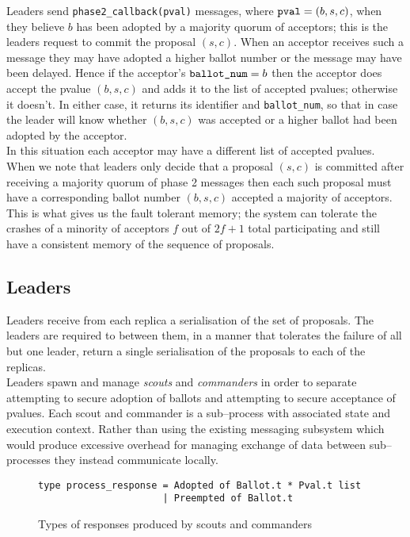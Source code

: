 Leaders send \texttt{phase2\_callback(pval)} messages, where $\textrm{\texttt{pval}} = \left( b, s, c \right)$, when they believe $b$ has been adopted by a majority quorum of acceptors; this is the leaders request to commit the proposal $(s,c)$. When an acceptor receives such a message they may have adopted a higher ballot number or the message may have been delayed. Hence if the acceptor's $\textrm{\texttt{ballot\_num}} = b$ then the acceptor does accept the pvalue $(b,s,c)$ and adds it to the list of accepted pvalues; otherwise it doesn't. In either case, it returns its identifier and \texttt{ballot\_num}, so that in case the leader will know whether $(b,s,c)$ was accepted or a higher ballot had been adopted by the acceptor. \\

In this situation each acceptor may have a different list of accepted pvalues. When we note that leaders only decide that a proposal $(s,c)$ is committed after receiving a majority quorum of phase 2 messages then each such proposal must have a corresponding ballot number $(b,s,c)$ accepted a majority of acceptors. This is what gives us the fault tolerant memory; the system can tolerate the crashes of a minority of acceptors $f$ out of $2f+1$ total participating and still have a consistent memory of the sequence of proposals.

\subsection{Leaders}

Leaders receive from each replica a serialisation of the set of proposals. The leaders are required to between them, in a manner that tolerates the failure of all but one leader, return a single serialisation of the proposals to each of the replicas. \\

Leaders spawn and manage \emph{scouts} and \emph{commanders} in order to separate attempting to secure adoption of ballots and attempting to secure acceptance of pvalues. Each scout and commander is a sub--process with associated state and execution context. Rather than using the existing messaging subsystem which would produce excessive overhead for managing exchange of data between sub--processes they instead communicate locally. \\

\begin{figure}
  \begin{lstlisting}
type process_response = Adopted of Ballot.t * Pval.t list
                      | Preempted of Ballot.t    
  \end{lstlisting}
  \caption{Types of responses produced by scouts and commanders}
  \label{fig:sub-process-responses}
\end{figure}

